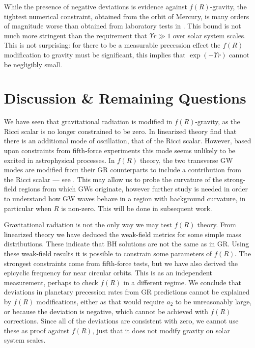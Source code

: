 While the presence of negative deviations is evidence against $f(R)$-gravity, the tightest numerical constraint, obtained from the orbit of Mercury, is many orders of magnitude worse than obtained from laboratory tests in . This bound is not much more stringent than the requirement that $\Upsilon r \gg 1$ over solar system scales. This is not surprising: for there to be a measurable precession effect the $f(R)$ modification to gravity must be significant, this implies that $\exp(-\Upsilon r)$ cannot be negligibly small.

\section{Discussion \& Remaining Questions}

We have seen that gravitational radiation is modified in $f(R)$-gravity, as the Ricci scalar is no longer constrained to be zero. In linearized theory find that there is an additional mode of oscillation, that of the Ricci scalar. However, based upon constraints from fifth-force experiments this mode seems unlikely to be excited in astrophysical processes. In $f(R)$ theory, the two transverse GW modes are modified from their GR counterparts to include a contribution from the Ricci scalar --- see . This may allow us to probe the curvature of the strong-field regions from which GWs originate, however further study is needed in order to understand how GW waves behave in a region with background curvature, in particular when $R$ is non-zero. This will be done in subsequent work.

Gravitational radiation is not the only way we may test $f(R)$ theory. From linearized theory we have deduced the weak-field metrics for some simple mass distributions. These indicate that BH solutions are not the same as in GR. Using these weak-field results it is possible to constrain some parameters of $f(R)$. The strongest constraints come from fifth-force tests, but we have also derived the epicyclic frequency for near circular orbits. This is as an independent measurement, perhaps to check $f(R)$ in a different regime. We conclude that deviations in planetary precession rates from GR predictions cannot be explained by $f(R)$ modifications, either as that would require $a_2$ to be unreasonably large, or because the deviation is negative, which cannot be achieved with $f(R)$ corrections. Since all of the deviations are consistent with zero, we cannot use these as proof against $f(R)$, just that it does not modify gravity on solar system scales.

